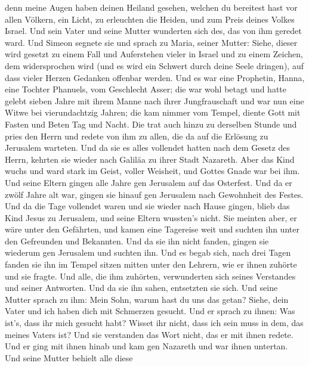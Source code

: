  denn meine Augen haben deinen Heiland gesehen,
 welchen du bereitest hast vor allen Völkern, 
ein Licht, zu erleuchten die Heiden, und zum Preis deines Volkes Israel.
 Und sein Vater und seine Mutter wunderten sich des, das
von ihm geredet ward.  Und Simeon segnete sie und sprach zu
Maria, seiner Mutter: Siehe, dieser wird gesetzt zu einem Fall und
Auferstehen vieler in Israel und zu einem Zeichen, dem widersprochen
wird  (und es wird ein Schwert durch deine Seele dringen),
auf dass vieler Herzen Gedanken offenbar werden.  Und es
war eine Prophetin, Hanna, eine Tochter Phanuels, vom Geschlecht Asser;
die war wohl betagt und hatte gelebt sieben Jahre mit ihrem Manne nach
ihrer Jungfrauschaft  und war nun eine Witwe bei
vierundachtzig Jahren; die kam nimmer vom Tempel, diente Gott mit Fasten
und Beten Tag und Nacht.  Die trat auch hinzu zu derselben
Stunde und pries den Herrn und redete von ihm zu allen, die da auf die
Erlösung zu Jerusalem warteten.  Und da sie es alles
vollendet hatten nach dem Gesetz des Herrn, kehrten sie wieder nach
Galiläa zu ihrer Stadt Nazareth.  Aber das Kind wuchs und
ward stark im Geist, voller Weisheit, und Gottes Gnade war bei ihm.
 Und seine Eltern gingen alle Jahre gen Jerusalem auf das
Osterfest.  Und da er zwölf Jahre alt war, gingen sie
hinauf gen Jerusalem nach Gewohnheit des Festes.  Und da
die Tage vollendet waren und sie wieder nach Hause gingen, blieb das
Kind Jesus zu Jerusalem, und seine Eltern wussten's nicht. 
Sie meinten aber, er wäre unter den Gefährten, und kamen eine Tagereise
weit und suchten ihn unter den Gefreunden und Bekannten. 
Und da sie ihn nicht fanden, gingen sie wiederum gen Jerusalem und
suchten ihn.  Und es begab sich, nach drei Tagen fanden sie
ihn im Tempel sitzen mitten unter den Lehrern, wie er ihnen zuhörte und
sie fragte.  Und alle, die ihm zuhörten, verwunderten sich
seines Verstandes und seiner Antworten.  Und da sie ihn
sahen, entsetzten sie sich. Und seine Mutter sprach zu ihm: Mein Sohn,
warum hast du uns das getan? Siehe, dein Vater und ich haben dich mit
Schmerzen gesucht.  Und er sprach zu ihnen: Was ist's, dass
ihr mich gesucht habt? Wisset ihr nicht, dass ich sein muss in dem, das
meines Vaters ist?  Und sie verstanden das Wort nicht, das
er mit ihnen redete.  Und er ging mit ihnen hinab und kam
gen Nazareth und war ihnen untertan. Und seine Mutter behielt alle diese
